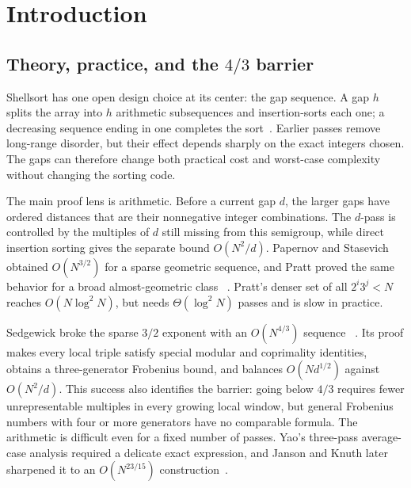 \section{Introduction}
\label{sec:introduction}

\subsection{Theory, practice, and the \texorpdfstring{$4/3$}{4/3} barrier}

Shellsort has one open design choice at its center: the gap sequence.  A gap
$h$ splits the array into $h$ arithmetic subsequences and insertion-sorts each
one; a decreasing sequence ending in one completes the sort~\cite{shell1959}.
Earlier passes remove long-range disorder, but their effect depends sharply on
the exact integers chosen.  The gaps can therefore change both practical cost
and worst-case complexity without changing the sorting code.

The main proof lens is arithmetic.  Before a current gap $d$, the larger gaps
have ordered distances that are their nonnegative integer combinations.  The
$d$-pass is controlled by the multiples of $d$ still missing from this
semigroup, while direct insertion sorting gives the separate bound $O(N^2/d)$.
Papernov and Stasevich obtained $O(N^{3/2})$ for a sparse geometric sequence,
and Pratt proved the same behavior for a broad almost-geometric class
~\cite{papernov1965,pratt1972}.  Pratt's denser set of all $2^i3^j<N$ reaches
$O(N\log^2N)$, but needs $\Theta(\log^2N)$ passes and is slow in practice.

Sedgewick broke the sparse $3/2$ exponent with an $O(N^{4/3})$ sequence
~\cite{sedgewick1986}.  Its proof makes every local triple satisfy special
modular and coprimality identities, obtains a three-generator Frobenius bound,
and balances $O(Nd^{1/2})$ against $O(N^2/d)$.  This success also identifies
the barrier: going below $4/3$ requires fewer unrepresentable multiples in
every growing local window, but general Frobenius numbers with four or more
generators have no comparable formula.  The arithmetic is difficult even for
a fixed number of passes.  Yao's three-pass average-case analysis required a
delicate exact expression, and Janson and Knuth later sharpened it to an
$O(N^{23/15})$ construction~\cite{yao1980,jansonknuth1997}.

